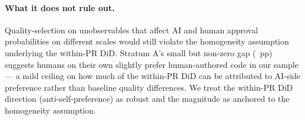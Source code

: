 \paragraph{What it does not rule out.} Quality-selection on unobservables that affect AI and human approval probabilities on different scales would still violate the homogeneity assumption underlying the within-PR DiD. Stratum A's small but non-zero gap (\PLACEHOLDERANCHORAGAP{}~pp) suggests humans on their own slightly prefer human-authored code in our sample --- a mild ceiling on how much of the within-PR DiD can be attributed to AI-side preference rather than baseline quality differences. We treat the within-PR DiD direction (anti-self-preference) as robust and the magnitude as anchored to the homogeneity assumption.
